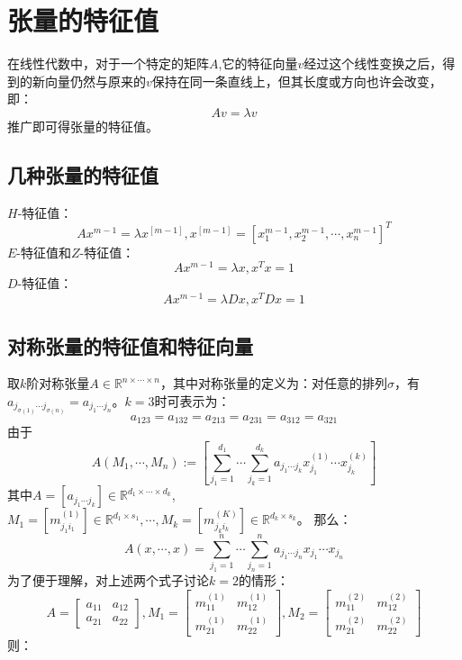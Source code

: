 \documentclass[UTF8]{ctexart}
\begin{document}
\section{张量的特征值}
在线性代数中，对于一个特定的矩阵$A$,它的特征向量$v$经过这个线性变换之后，得到的新向量仍然与原来的$v$保持在同一条直线上，但其长度或方向也许会改变，即：$$Av = \lambda v$$ 推广即可得张量的特征值。
\subsection{几种张量的特征值} 
$H$-特征值：\cite{ding2015generalized}
$$Ax^{m-1} = \lambda x^{[m-1]},x^{[m-1]} = [x_1^{m-1},x_2^{m-1},\cdots,x_n^{m-1}]^T$$
$E$-特征值和$Z$-特征值：
$$Ax^{m-1} = \lambda x,x^Tx = 1$$
$D$-特征值：
$$Ax^{m-1} = \lambda Dx,x^TDx = 1$$
\subsection{对称张量的特征值和特征向量}
取$k$阶对称张量$A \in \mathbb{R}^{n \times \cdots \times n}$，其中对称张量的定义为：对任意的排列$\sigma$，有$a_{j_{\sigma (1)} \cdots j_{\sigma (n)}} = a_{j_1 \cdots j_n}$。$k = 3$时可表示为：\cite{lim2005singular}
$$a_{123} = a_{132} = a_{213} = a_{231} = a_{312} = a_{321}$$
由于
$$A(M_1, \cdots, M_n) := [\sum_{j_1 = 1}^{d_1} \cdots \sum_{j_k = 1}^{d_k} a_{j_1 \cdots j_k}x_{j_1}^{(1)} \cdots x_{j_k}^{(k)}]$$
其中$A = [a_{j_1 \cdots j_k}] \in \mathbb{R}^{d_1 \times \cdots \times d_k}$,$M_1 = [m_{j_1 i_1}^{(1)}] \in \mathbb{R}^{d_1 \times s_1},\cdots,M_k = [m_{j_k i_k}^{(K)}] \in \mathbb{R}^{d_k \times s_k}$。\newline
那么：
$$A(x, \cdots, x) = \sum_{j_1 = 1}^{n} \cdots \sum_{j_n = 1}^{n} a_{j_1 \cdots j_n}x_{j_1} \cdots x_{j_n}$$
为了便于理解，对上述两个式子讨论$k = 2$的情形：
$$
  A =
  \left[
  \begin{matrix}
  a_{11} & a_{12} \\
  a_{21} & a_{22} 
  \end{matrix}
  \right],
  M_1 =
  \left[
  \begin{matrix}
  m_{11}^{(1)} & m_{12}^{(1)} \\
  m_{21}^{(1)} & m_{22}^{(1)}
  \end{matrix}
  \right],
  M_2 =
  \left[
  \begin{matrix}
  m_{11}^{(2)} & m_{12}^{(2)} \\
  m_{21}^{(2)} & m_{22}^{(2)}
  \end{matrix}
  \right]
$$
则：\newline
\end{document}
